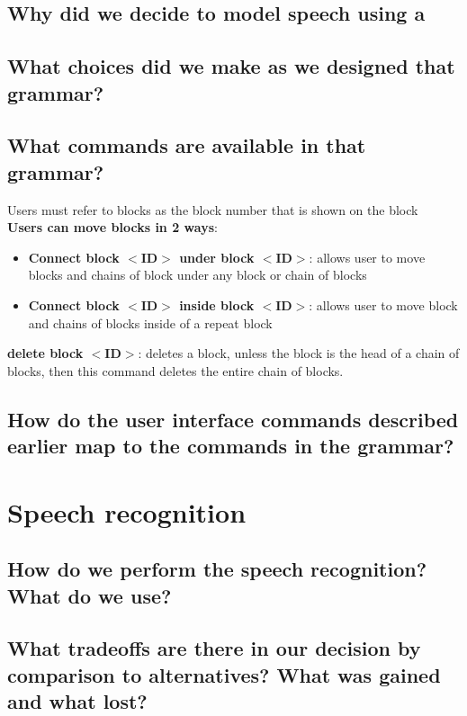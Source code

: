 \documentclass[]{article}
\begin{document}
\subsection{Why did we decide to model speech using a} %

\subsection{What choices did we make as we designed that grammar?}

\subsection{What commands are available in that grammar?}
Users must refer to blocks as the block number that is shown on the block\\
\textbf{Users can move blocks in 2 ways}:
\begin{itemize}
\item \textbf{Connect block $<$ID$>$ under block $<$ID$>$}: allows user to move blocks and chains of block under any block or chain of blocks
\item \textbf{Connect block $<$ID$>$ inside block $<$ID$>$}: allows user to move block and chains of blocks inside of a repeat block
\end{itemize}
\textbf{delete block $<$ID$>$}: deletes a block,  unless the block is the head of a chain of blocks, then this command deletes the entire chain of blocks.
\subsection{How do the user interface commands described earlier map to the commands in the grammar?  }

\section{Speech recognition}

\subsection{How do we perform the speech recognition? What do we use?}

\subsection{What tradeoffs are there in our decision by comparison to alternatives? What was gained and what lost?}
\end{document}
